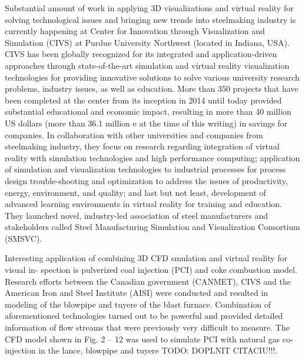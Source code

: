 Substantial amount of work in applying 3D visualizations and virtual reality for solving technological issues and bringing new trends into steelmaking industry is currently happening at Center for Innovation through Visualization and Simulation (CIVS) at Purdue University Northwest (located in Indiana, USA). CIVS has been globally recognized for its integrated and application-driven approaches through state-of-the-art simulation and virtual reality visualization technologies for providing innovative solutions to solve various university research problems, industry issues, as well as education. More than 350 projects that have been completed at the center from its inception in 2014 until today provided substantial educational and economic impact, resulting in more than 40 million US dollars (more than 36.1 million e at the time of this writing) in savings for companies. In collaboration with other universities and companies from steelmaking industry, they focus on research regarding integration of virtual reality with simulation technologies and high performance computing; application of simulation and visualization technologies to industrial processes for process design trouble-shooting and optimization to address the issues of productivity, energy, environment, and quality; and last but not least, development of advanced learning environments in virtual reality for training and education. They launched novel, industry-led association of steel manufacturers and stakeholders called Steel Manufacturing Simulation and Visualization Consortium (SMSVC).

Interesting application of combining 3D CFD smulation and virtual reality for visual in- spection is pulverized coal injection (PCI) and coke combustion model. Research efforts between the Canadian government (CANMET), CIVS and the American Iron and Steel Institute (AISI) were conducted and resulted in modeling of the blowpipe and tuyere of the blast furnace. Combination of aforementioned technologies turned out to be powerful and provided detailed information of flow streams that were previously very difficult to measure. The CFD model shown in Fig. 2 – 12 was used to simulate PCI with natural gas co-injection in the lance, blowpipe and tuyere TODO: DOPLNIT CITACIU!!!.

